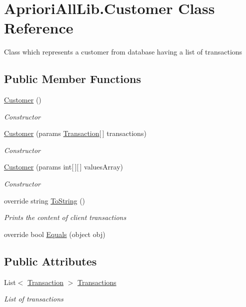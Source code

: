 \hypertarget{class_apriori_all_lib_1_1_customer}{\section{Apriori\-All\-Lib.\-Customer Class Reference}
\label{class_apriori_all_lib_1_1_customer}
}


Class which represents a customer from database having a list of transactions  


\subsection*{Public Member Functions}
\begin{DoxyCompactItemize}
\item 
\hyperlink{class_apriori_all_lib_1_1_customer_af02616d948989c7ff6161efc2488ecab}{Customer} ()
\begin{DoxyCompactList}\small\item\em Constructor \end{DoxyCompactList}\item 
\hyperlink{class_apriori_all_lib_1_1_customer_a168c8ef2fa0b53671ea51fa21d788f7e}{Customer} (params \hyperlink{class_apriori_all_lib_1_1_transaction}{Transaction}\mbox{[}$\,$\mbox{]} transactions)
\begin{DoxyCompactList}\small\item\em Constructor \end{DoxyCompactList}\item 
\hyperlink{class_apriori_all_lib_1_1_customer_a8a0e52125e85fae2662fa7edb756cedd}{Customer} (params int\mbox{[}$\,$\mbox{]}\mbox{[}$\,$\mbox{]} values\-Array)
\begin{DoxyCompactList}\small\item\em Constructor \end{DoxyCompactList}\item 
override string \hyperlink{class_apriori_all_lib_1_1_customer_a311c3424f3f1207afe9b883cc41cae60}{To\-String} ()
\begin{DoxyCompactList}\small\item\em Prints the content of client transactions \end{DoxyCompactList}\item 
override bool \hyperlink{class_apriori_all_lib_1_1_customer_a8036f14573c62b0e4785e7157a1f547b}{Equals} (object obj)
\end{DoxyCompactItemize}
\subsection*{Public Attributes}
\begin{DoxyCompactItemize}
\item 
List$<$ \hyperlink{class_apriori_all_lib_1_1_transaction}{Transaction} $>$ \hyperlink{class_apriori_all_lib_1_1_customer_a5bf3b782d5e9c582e3f395834b7bddad}{Transactions}
\begin{DoxyCompactList}\small\item\em List of transactions \end{DoxyCompactList}\end{DoxyCompactItemize}


